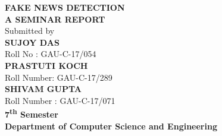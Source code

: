 \documentclass[a4paper]{article}
\begin{document}
	
	\begin{center}
		\large{
			\textbf{\Huge FAKE NEWS DETECTION}\\[2\baselineskip]
			\textbf{\large A SEMINAR REPORT}\\[\baselineskip]
			Submitted by\\[\baselineskip]
			\textbf{SUJOY DAS }\\
			Roll No : GAU-C-17/054\\[\baselineskip]
			\textbf{PRASTUTI KOCH}\\
			Roll Number: GAU-C-17/289\\[\baselineskip]
			\textbf{SHIVAM GUPTA}\\
			Roll Number : GAU-C-17/071\\[\baselineskip]
			\textbf{7\textsuperscript{th} Semester}\\
			\textbf{Department of Computer Science and Engineering}\\[\baselineskip]
			
}
\end{center}
\end{document}

